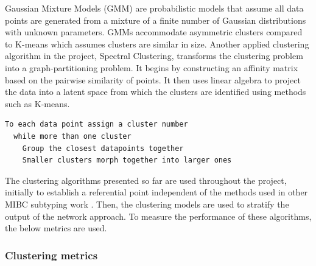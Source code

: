 Gaussian Mixture Models (GMM) are probabilistic models that assume all data points are generated from a mixture of a finite number of Gaussian distributions with unknown parameters. GMMs accommodate asymmetric clusters compared to K-means which assumes clusters are similar in size. Another applied clustering algorithm in the project, Spectral Clustering, transforms the clustering problem into a graph-partitioning problem. It begins by constructing an affinity matrix based on the pairwise similarity of points. It then uses linear algebra to project the data into a latent space from which the clusters are identified using methods such as K-means.
~\\
\begin{lstlisting}[caption={Agglomerative hierarchical clustering pseudocode}, label={code:agg_clustering}]
  To each data point assign a cluster number
  while more than one cluster
    Group the closest datapoints together 
    Smaller clusters morph together into larger ones
\end{lstlisting} 

The clustering algorithms presented so far are used throughout the project, initially to establish a referential point independent of the methods used in other MIBC subtyping work \cite{Robertson2017-mg, Marzouka2018-ge, Kamoun2020-tj}. Then, the clustering models are used to stratify the output of the network approach. To measure the performance of these algorithms, the below metrics are used.


\subsubsection*{Clustering metrics} \label{s:lit:clustering_metrics}

